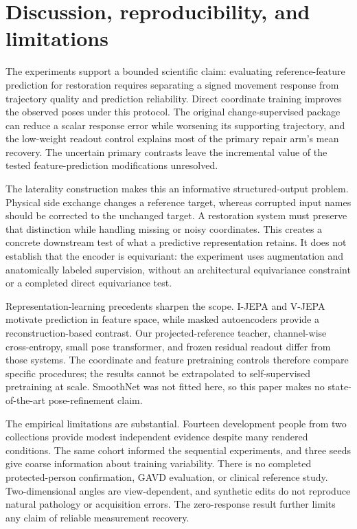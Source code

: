 \documentclass{article}
\begin{document}
\clearpage
\section{Discussion, reproducibility, and limitations}
The experiments support a bounded scientific claim: evaluating reference-feature prediction for restoration requires separating a signed movement response from trajectory quality and prediction reliability. Direct coordinate training improves the observed poses under this protocol. The original change-supervised package can reduce a scalar response error while worsening its supporting trajectory, and the low-weight readout control explains most of the primary repair arm's mean recovery. The uncertain primary contrasts leave the incremental value of the tested feature-prediction modifications unresolved.

The laterality construction makes this an informative structured-output problem. Physical side exchange changes a reference target, whereas corrupted input names should be corrected to the unchanged target. A restoration system must preserve that distinction while handling missing or noisy coordinates. This creates a concrete downstream test of what a predictive representation retains. It does not establish that the encoder is equivariant: the experiment uses augmentation and anatomically labeled supervision, without an architectural equivariance constraint or a completed direct equivariance test.

Representation-learning precedents sharpen the scope. I-JEPA and V-JEPA \citep{assran2023ijepa,bardes2024vjepa} motivate prediction in feature space, while masked autoencoders \citep{he2022mae} provide a reconstruction-based contrast. Our projected-reference teacher, channel-wise cross-entropy, small pose transformer, and frozen residual readout differ from those systems. The coordinate and feature pretraining controls therefore compare specific procedures; the results cannot be extrapolated to self-supervised pretraining at scale. SmoothNet was not fitted here, so this paper makes no state-of-the-art pose-refinement claim.

The empirical limitations are substantial. Fourteen development people from two collections provide modest independent evidence despite many rendered conditions. The same cohort informed the sequential experiments, and three seeds give coarse information about training variability. There is no completed protected-person confirmation, GAVD evaluation, or clinical reference study. Two-dimensional angles are view-dependent, and synthetic edits do not reproduce natural pathology or acquisition errors. The zero-response result further limits any claim of reliable measurement recovery.
\end{document}
